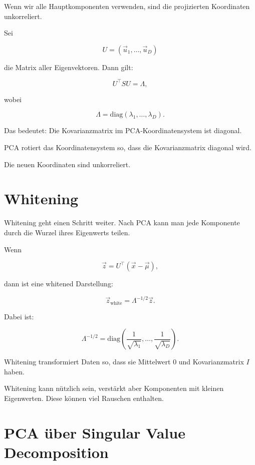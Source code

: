 Wenn wir alle Hauptkomponenten verwenden, sind die projizierten Koordinaten unkorreliert.

Sei

\[
    U
    =
    (\vec{u}_1,\dots,\vec{u}_D)
\]

die Matrix aller Eigenvektoren.
Dann gilt:

\[
    U^{\top}SU
    =
    \Lambda,
\]

wobei

\[
    \Lambda
    =
    \mathrm{diag}(\lambda_1,\dots,\lambda_D).
\]

Das bedeutet:
Die Kovarianzmatrix im PCA-Koordinatensystem ist diagonal.

\begin{conceptbox}
PCA rotiert das Koordinatensystem so, dass die Kovarianzmatrix diagonal wird.

Die neuen Koordinaten sind unkorreliert.
\end{conceptbox}

\section{Whitening}

Whitening geht einen Schritt weiter.
Nach PCA kann man jede Komponente durch die Wurzel ihres Eigenwerts teilen.

Wenn

\[
    \vec{z}
    =
    U^{\top}(\vec{x}-\vec{\mu}),
\]

dann ist eine whitened Darstellung:

\[
    \vec{z}_{\mathrm{white}}
    =
    \Lambda^{-1/2}
    \vec{z}.
\]

Dabei ist:

\[
    \Lambda^{-1/2}
    =
    \mathrm{diag}
    \left(
        \frac{1}{\sqrt{\lambda_1}},
        \dots,
        \frac{1}{\sqrt{\lambda_D}}
    \right).
\]

\begin{definitionbox}
Whitening transformiert Daten so, dass sie Mittelwert \(0\) und Kovarianzmatrix \(I\) haben.
\end{definitionbox}

\begin{notebox}
Whitening kann nützlich sein, verstärkt aber Komponenten mit kleinen Eigenwerten.
Diese können viel Rauschen enthalten.
\end{notebox}

\section{PCA über Singular Value Decomposition}

